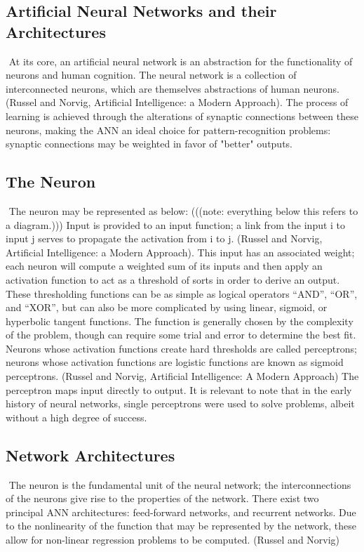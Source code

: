 \documentclass[11pt]{article}
\begin{document}
\subsection{Artificial Neural Networks and their Architectures}$ $
\indent At its core, an artificial neural network is an abstraction for the functionality of neurons and human cognition. The neural network is a collection of interconnected neurons, which are themselves abstractions of human neurons. (Russel and Norvig, Artificial Intelligence: a Modern Approach). The process of learning is achieved through the alterations of synaptic connections between these neurons, making the ANN an ideal choice for pattern-recognition problems: synaptic connections may be weighted in favor of "better" outputs.

\subsection{The Neuron}$ $
\indent The neuron may be represented as below:
(((note: everything below this refers to a diagram.)))
Input is provided to an input function; a link from the input i to input j serves to propagate the activation from i to j. (Russel and Norvig, Artificial Intelligence: a Modern Approach). This input has an associated weight; each neuron will compute a weighted sum of its inputs and then apply an activation function to act as a threshold of sorts in order to derive an output. These thresholding functions can be as simple as logical operators “AND”, “OR”, and “XOR”, but can also be more complicated by using linear, sigmoid, or hyperbolic tangent functions. The function is generally chosen by the complexity of the problem, though can require some trial and error to determine the best fit.  Neurons whose activation functions create hard thresholds are called perceptrons; neurons whose activation functions are logistic functions are known as sigmoid perceptrons. (Russel and Norvig, Artificial Intelligence: A Modern Approach) The perceptron maps input directly to output. It is relevant to note that in the early history of neural networks, single perceptrons were used to solve problems, albeit without a high degree of success. 

\subsection{Network Architectures}$ $
\indent The neuron is the fundamental unit of the neural network; the interconnections of the neurons give rise to the properties of the network. There exist two principal ANN architectures: feed-forward networks, and recurrent networks. Due to the nonlinearity of the function that may be represented by the network, these allow for non-linear regression problems to be computed. (Russel and Norvig)
\end{document}
